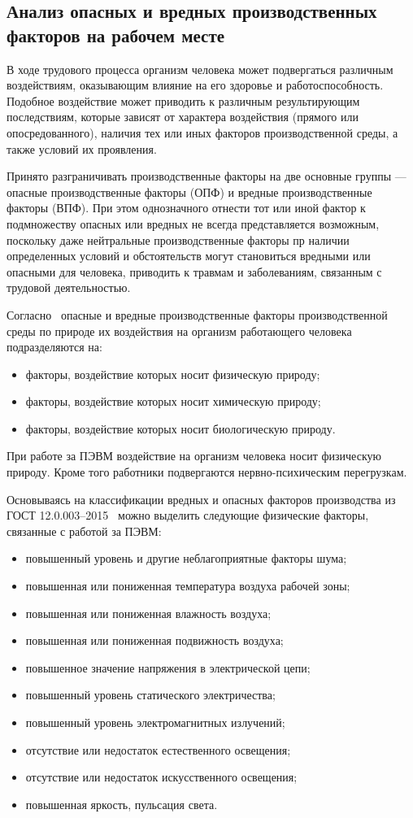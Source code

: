 \subsection{Анализ опасных и вредных производственных факторов на рабочем месте}

В ходе трудового процесса организм человека может подвергаться различным воздействиям, 
оказывающим влияние на его здоровье и работоспособность. Подобное воздействие может приводить к 
различным результирующим последствиям, которые зависят от характера воздействия (прямого или
опосредованного), наличия тех или иных факторов производственной среды, а также условий
их проявления. 

Принято разграничивать производственные факторы на две основные группы --- опасные производственные факторы
(ОПФ) и вредные производственные факторы (ВПФ). При этом однозначного отнести тот или иной
фактор к подмножеству опасных или вредных не всегда представляется возможным, поскольку
даже нейтральные производственные факторы пр наличии определенных условий и обстоятельств
могут становиться вредными или опасными для человека, приводить к травмам и заболеваниям, 
связанным с трудовой деятельностью.

Согласно~\cite{gost_12.0.003-2015} опасные и вредные производственные факторы производственной
среды по природе их воздействия на организм работающего человека подразделяются на:
\begin{itemize}
 \item факторы, воздействие которых носит физическую природу;
 \item факторы, воздействие которых носит химическую природу;
 \item факторы, воздействие которых носит биологическую природу.
\end{itemize}

При работе за ПЭВМ воздействие на организм человека носит физическую природу. Кроме того
работники подвергаются нервно-психическим перегрузкам.

Основываясь на классификации вредных и опасных факторов производства из ГОСТ 12.0.003--2015~\cite{gost_12.0.003-2015} 
можно выделить следующие физические факторы, связанные с работой за ПЭВМ:
\begin{itemize}
 \item повышенный уровень и другие неблагоприятные факторы шума;
 \item повышенная или пониженная температура воздуха рабочей зоны;
 \item повышенная или пониженная влажность воздуха;
 \item повышенная или пониженная подвижность воздуха;
 \item повышенное значение напряжения в электрической цепи;
 \item повышенный уровень статического электричества;
 \item повышенный уровень электромагнитных излучений;
 \item отсутствие или недостаток естественного освещения;
 \item отсутствие или недостаток искусственного освещения;
 \item повышенная яркость, пульсация света. 
\end{itemize}

